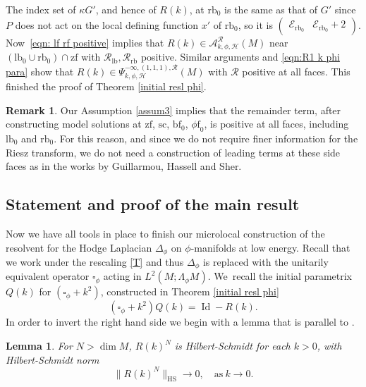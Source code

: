 \documentclass[JEP,XML,SOM,Unicode,NoFloatCountersInSection,published]{cedram}
\theoremstyle{plain}
\newtheorem{Lemma}[Th]{Lemma}
\theoremstyle{definition}
\newtheorem{Rem}[Th]{Remark}
\newcommand\calA{{\mathcal A}}
\newcommand\calE{{\mathcal E}}
\newcommand\calR{{\mathcal R}}
\newcommand{\phif}{{\phi\mathrm{f}}}
\newcommand{\lf}{{\mathrm{lb}}}
\newcommand{\rf}{{\mathrm{rb}}}
\newcommand{\lfz}{{\mathrm{lb}_0}}
\newcommand{\rfz}{{\mathrm{rb}_0}}
\newcommand{\bbf}{{\mathrm{bf}}}
\newcommand{\bbfz}{{\bbf_0}}
\newcommand{\ssc}{{\mathrm{sc}}}
\newcommand{\zf}{{\mathrm{zf}}}
\DeclareMathOperator{\Id}{Id}
\begin{document}
The index set of $\kappa G'$, and hence of $R(k)$, at $\rfz$ is the same as that of $G'$ since~$P$ does not act on the local defining function $x'$ of $\rfz$, so it is $
\begin{pmatrix}
\calE_\rfz & \calE_\rfz+2
\end{pmatrix}
$.
Now~\eqref{eqn: lf rf positive} implies that $R(k)\in\calA^{\calR}_{k,\phi,\mathscr{H}}(M)$ near $(\lf_0\cup\rfz)\cap\zf$ with $\calR_\lf,\calR_\rf$ positive. Similar arguments and \eqref{eqn:R1 k phi para} show that
$R(k)\in\Psi^{-\infty,(1,1,1),\calR}_{k,\phi,\mathscr{H}}(M)$ with $\calR$ positive at all faces.
This finished the proof of Theorem \ref{initial resl phi}.

\begin{Rem}
Our Assumption \ref{assum3} implies that the remainder term, after constructing model solutions at $\zf$, $\ssc$, $\bbfz$, $\phif_0$, is positive at all faces, including $\lfz$ and $\rfz$. For this reason, and since we do not require finer information for the Riesz transform, we do not need a construction of leading terms at these side faces as in the works by
Guillarmou, Hassell and Sher.
\end{Rem}

\subsection{Statement and proof of the main result} \label{section 9}
Now we have all tools in place to finish our microlocal construction of the resolvent
for the Hodge Laplacian $\Delta_{\phi}$ on $\phi$\nobreakdash-manifolds
at low energy. Recall that we work under the rescaling \eqref{T} and thus $\Delta_{\phi}$
is replaced with the unitarily equivalent operator $\square_{\phi}$ acting in $L^2(M;\Lambda_\phi M)$.
We~recall the initial parametrix $Q(k)$ for $(\square_{\phi} + k^{2})$,
constructed in Theorem \ref{initial resl phi}\vspace*{-3pt}
\[
(\square_{\phi} + k^{2}) Q(k) = \Id - R(k).
\]
In order to invert the right hand side we begin with a lemma that is parallel to
\cite[Cor.\,2.11]{guillarmou2008resolvent}.

\begin{Lemma} \label{hilbert}
For $N > \dim M$, $R(k)^{N}$ is Hilbert-Schmidt for
each $k > 0$, with Hilbert-Schmidt norm\vspace*{-3pt}\enlargethispage{\baselineskip}%
\begin{equation*}
\lVert R(k)^{N} \rVert_{\text{HS}} \to 0,
\quad \text{as} \ k \to 0.
\end{equation*}
\end{Lemma}
\end{document}
